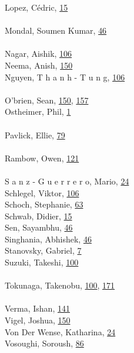 \documentclass[11pt,oneside]{book}
\begin{document}
\begin{multicols}{2}
Lopez, Cédric, \hyperlink{page.15}{15}\\
\\ %
Mondal, Soumen Kumar, \hyperlink{page.46}{46}\\
\\ %
Nagar, Aishik, \hyperlink{page.106}{106}\\
Neema, Anish, \hyperlink{page.150}{150}\\
Nguyen, T h a n h - T u n g, \hyperlink{page.106}{106}\\
\\ %
O'brien, Sean, \hyperlink{page.150}{150}, \hyperlink{page.157}{157}\\
Ostheimer, Phil, \hyperlink{page.1}{1}\\
\\ %
Pavlick, Ellie, \hyperlink{page.79}{79}\\
\\ %
Rambow, Owen, \hyperlink{page.121}{121}\\
\\ %
S a n z - G u e r r e r o, Mario, \hyperlink{page.24}{24}\\
Schlegel, Viktor, \hyperlink{page.106}{106}\\
Schoch, Stephanie, \hyperlink{page.63}{63}\\
Schwab, Didier, \hyperlink{page.15}{15}\\
Sen, Sayambhu, \hyperlink{page.46}{46}\\
Singhania, Abhishek, \hyperlink{page.46}{46}\\
Stanovsky, Gabriel, \hyperlink{page.7}{7}\\
Suzuki, Takeshi, \hyperlink{page.100}{100}\\
\\ %
Tokunaga, Takenobu, \hyperlink{page.100}{100}, \hyperlink{page.171}{171}\\
\\ %
Verma, Ishan, \hyperlink{page.141}{141}\\
Vigel, Joshua, \hyperlink{page.150}{150}\\
Von Der Wense, Katharina, \hyperlink{page.24}{24}\\
Vosoughi, Soroush, \hyperlink{page.86}{86}\\
\\ %

\end{multicols}
\end{document}
